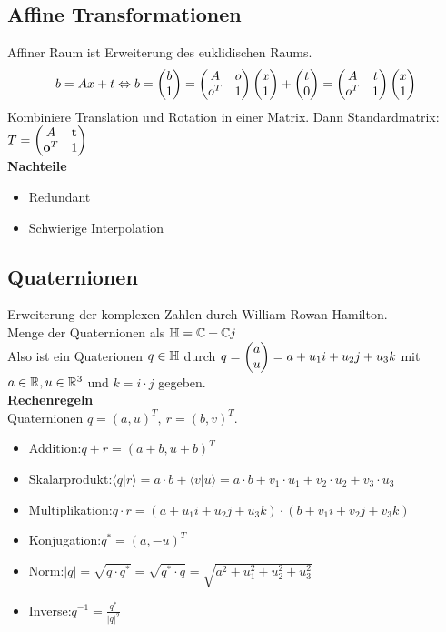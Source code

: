 \subsection{Affine Transformationen}
Affiner Raum ist Erweiterung des euklidischen Raums.
\begin{equation}
  b = Ax + t
    \Leftrightarrow
    b = \begin{pmatrix}b \\ 1\end{pmatrix} = \begin{pmatrix}A & o \\ o^T & 1\end{pmatrix} \begin{pmatrix}x \\ 1\end{pmatrix} + \begin{pmatrix}t \\ 0\end{pmatrix} =
    \begin{pmatrix}A & t \\ o^T & 1\end{pmatrix}\begin{pmatrix}x \\ 1\end{pmatrix}
\end{equation}
Kombiniere Translation und Rotation in einer Matrix. Dann Standardmatrix:
\(T = \begin{pmatrix}A & \mathbf{t} \\ \mathbf{o}^T & 1\end{pmatrix}\)\\

\textbf{Nachteile}
\begin{itemize}
\item Redundant
\item Schwierige Interpolation
\end{itemize}

\subsection{Quaternionen}
Erweiterung der komplexen Zahlen \complexnumbers{} durch William Rowan Hamilton.\\
Menge der Quaternionen \quaternionen{} als \( \mathbb{H} = \mathbb{C} + \mathbb{C} j\)\\
Also ist ein Quaterionen \(q \in \mathbb{H}\) durch \(q = \begin{pmatrix}a \\ u\end{pmatrix} = a + u_1 i + u_2 j + u_3 k\) 
mit \(a \in \mathbb{R}, u \in \mathbb{R}^3\) und \( k = i \cdot j\) gegeben.\\

\textbf{Rechenregeln}\\
Quaternionen \(q = {(a, u)}^T,\ r = {(b,v)}^T\).
\begin{itemize}
\item Addition:\@ \(q + r = {(a + b, u + b)}^T\)
\item Skalarprodukt:\@ \(\langle q \lvert r\rangle = a \cdot b + \langle v \lvert u \rangle = a \cdot b + v_1 \cdot u_1 + v_2 \cdot u_2 + v_3 \cdot u_3\)
\item Multiplikation:\@ \(q \cdot r = (a + u_1i + u_2j + u_3k) \cdot (b + v_1 i + v_2 j + v_3 k)\)
\item Konjugation:\@ \(q^* = {(a, -u)}^T\)
\item Norm:\@ \( \lvert q \lvert = \sqrt{q \cdot q^*} = \sqrt{q^* \cdot q} = \sqrt{a^2 + u_1^2 + u_2^2 + u_3^2}\)
\item Inverse:\@ \( q^{-1} = \frac{q^*}{{\lvert q \lvert}^2}\)
\end{itemize}

